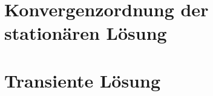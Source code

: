 \section{Konvergenzordnung der stationären Lösung}\label{sec:rates}


\section{Transiente Lösung}\label{sec:transient}
